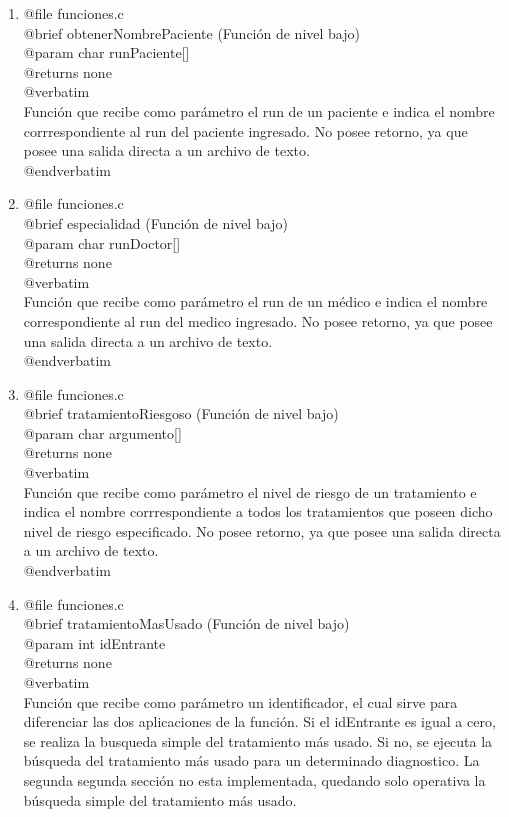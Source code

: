 \documentclass[12pt,letterpaper]{article}
\begin{document}
\begin{enumerate}
\item @file funciones.c\\
	  @brief obtenerNombrePaciente (Función de nivel bajo)\\
      @param char runPaciente[]\\
      @returns none\\
      @verbatim \\
    	Función que recibe como parámetro el run de un paciente e indica el nombre corrrespondiente al run del paciente ingresado. No posee retorno, ya que posee una salida directa a un archivo de texto.\\
      @endverbatim
\item @file funciones.c\\
	  	@brief especialidad (Función de nivel bajo)\\
    @param char runDoctor[]\\
    @returns none\\
    @verbatim \\
    	Función que recibe como parámetro el run de un médico e indica el nombre correspondiente al run del medico ingresado. No posee retorno, ya que posee una salida directa a un archivo de texto.\\
    @endverbatim
\item @file funciones.c\\ 
@brief tratamientoRiesgoso (Función de nivel bajo)\\
    @param char argumento[]\\
    @returns none\\
    @verbatim \\
    	Función que recibe como parámetro el nivel de riesgo de un tratamiento e indica el nombre corrrespondiente a todos los tratamientos que poseen dicho nivel de riesgo especificado. No posee retorno, ya que posee una salida directa a un archivo de texto.\\
    @endverbatim 
\item @file funciones.c\\ 
	@brief tratamientoMasUsado (Función de nivel bajo)\\
	@param int idEntrante\\
    @returns none\\
    @verbatim \\
    	Función que recibe como parámetro un identificador, el cual sirve para diferenciar las dos aplicaciones de la función. Si el idEntrante es igual a cero, se realiza la busqueda simple del tratamiento más usado. Si no, se ejecuta la búsqueda del tratamiento más usado para un determinado diagnostico. La segunda segunda sección no esta implementada, quedando solo operativa la búsqueda simple del tratamiento más usado. \\

\end{enumerate}
\end{document}
